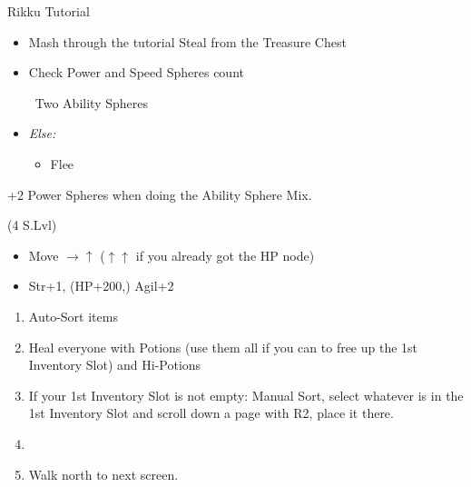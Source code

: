 \begin{battle}{Rikku Tutorial}
    \begin{itemize}
        \item Mash through the tutorial
        \rikkuf Steal from the Treasure Chest
        \item Check Power and Speed Spheres count
        \begin{itemize}
            \rikkuf \od\ Two Ability Spheres
        \end{itemize}
        \item \textit{Else:}
        \begin{itemize}
            \rikkuf \od\ Two Potions or Hi-Potions
            \rikkuf Defend
            \item Flee
        \end{itemize}
    \end{itemize}
    +2 Power Spheres when doing the Ability Sphere Mix.
\end{battle}
\begin{spheregrid}
    \begin{itemize}
        \tidusf (4 S.Lvl)
        \begin{itemize}
            \item Move $\rightarrow\uparrow$ ($\uparrow\uparrow$ if you already got the HP node)
            \item Str+1, (HP+200,) Agil+2
        \end{itemize}
    \end{itemize}
\end{spheregrid}
\wincb\losscb
\begin{enumerate}[resume]
    \item Auto-Sort items
    \item Heal everyone with Potions (use them all if you can to free up the 1st Inventory Slot) and Hi-Potions
    \item If your 1st Inventory Slot is not empty: Manual Sort, select whatever is in the 1st Inventory Slot and scroll down a page with R2, place it there.
    \item \formation{\tidus}{\wakka}{\auron}
    \item Walk north to next screen.
\end{enumerate}
\winnpsingle\lossnpsingle\bothnpsingle

